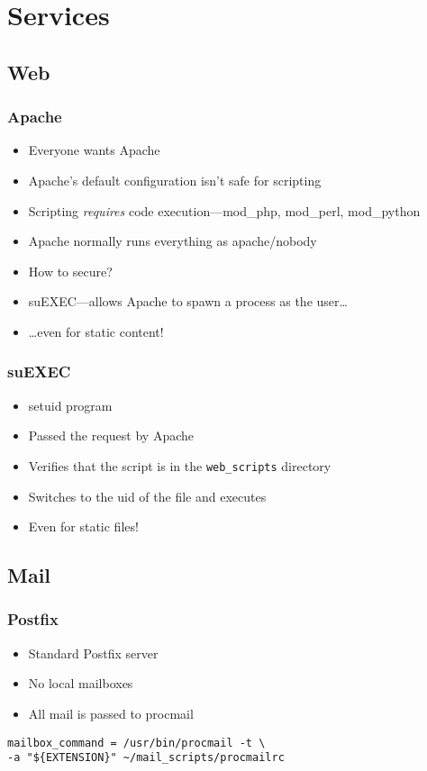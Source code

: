 \section{Services}

\subsection{Web}
\begin{frame}
  \frametitle{Apache}
  \begin{itemize}
      \item Everyone wants Apache
      \item Apache's default configuration isn't safe for scripting
      \item Scripting \emph{requires} code execution---mod\_php, mod\_perl, mod\_python
      \item Apache normally runs everything as apache/nobody
      \item How to secure?
      \pause
      \item suEXEC---allows Apache to spawn a process as the user\ldots
      \item {\ldots}even for static content!
  \end{itemize}
\end{frame}

\begin{frame}
  \frametitle{suEXEC}
  \begin{itemize}
    \item setuid program
    \item Passed the request by Apache
    \item Verifies that the script is in the {\tt web\_scripts} directory
    \item Switches to the uid of the file and executes
    \item Even for static files!
  \end{itemize}
\end{frame}

\subsection{Mail}

\begin{frame}[fragile]
  \frametitle{Postfix}
  \begin{itemize}
    \item Standard Postfix server
    \item No local mailboxes
    \item All mail is passed to procmail
  \end{itemize}
  \begin{verbatim}mailbox_command = /usr/bin/procmail -t \
-a "${EXTENSION}" ~/mail_scripts/procmailrc\end{verbatim}
\end{frame}

